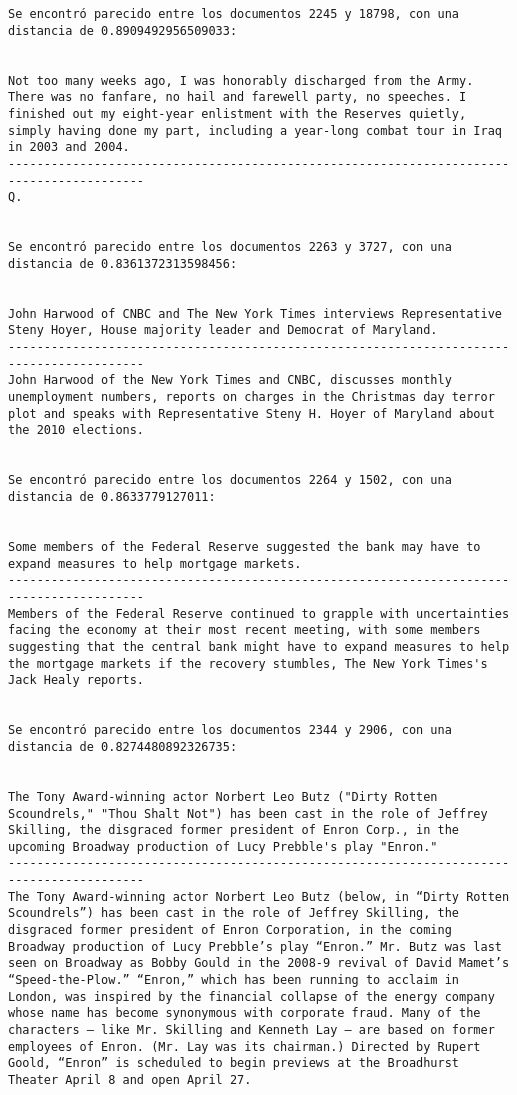 \documentclass[11pt]{article}
\begin{document}
\begin{Verbatim}[commandchars=\\\{\}]
Se encontró parecido entre los documentos 2245 y 18798, con una distancia de 0.8909492956509033:


Not too many weeks ago, I was honorably discharged from the Army. There was no fanfare, no hail and farewell party, no speeches. I finished out my eight-year enlistment with the Reserves quietly, simply having done my part, including a year-long combat tour in Iraq in 2003 and 2004.
-----------------------------------------------------------------------------------------
Q.


Se encontró parecido entre los documentos 2263 y 3727, con una distancia de 0.8361372313598456:


John Harwood of CNBC and The New York Times interviews Representative Steny Hoyer, House majority leader and Democrat of Maryland.
-----------------------------------------------------------------------------------------
John Harwood of the New York Times and CNBC, discusses monthly unemployment numbers, reports on charges in the Christmas day terror plot and speaks with Representative Steny H. Hoyer of Maryland about the 2010 elections. 


Se encontró parecido entre los documentos 2264 y 1502, con una distancia de 0.8633779127011:


Some members of the Federal Reserve suggested the bank may have to expand measures to help mortgage markets.
-----------------------------------------------------------------------------------------
Members of the Federal Reserve continued to grapple with uncertainties facing the economy at their most recent meeting, with some members suggesting that the central bank might have to expand measures to help the mortgage markets if the recovery stumbles, The New York Times's Jack Healy reports.


Se encontró parecido entre los documentos 2344 y 2906, con una distancia de 0.8274480892326735:


The Tony Award-winning actor Norbert Leo Butz ("Dirty Rotten Scoundrels," "Thou Shalt Not") has been cast in the role of Jeffrey Skilling, the disgraced former president of Enron Corp., in the upcoming Broadway production of Lucy Prebble's play "Enron."
-----------------------------------------------------------------------------------------
The Tony Award-winning actor Norbert Leo Butz (below, in “Dirty Rotten Scoundrels”) has been cast in the role of Jeffrey Skilling, the disgraced former president of Enron Corporation, in the coming Broadway production of Lucy Prebble’s play “Enron.” Mr. Butz was last seen on Broadway as Bobby Gould in the 2008-9 revival of David Mamet’s “Speed-the-Plow.” “Enron,” which has been running to acclaim in London, was inspired by the financial collapse of the energy company whose name has become synonymous with corporate fraud. Many of the characters — like Mr. Skilling and Kenneth Lay — are based on former employees of Enron. (Mr. Lay was its chairman.) Directed by Rupert Goold, “Enron” is scheduled to begin previews at the Broadhurst Theater April 8 and open April 27.



\end{Verbatim}
\end{document}
